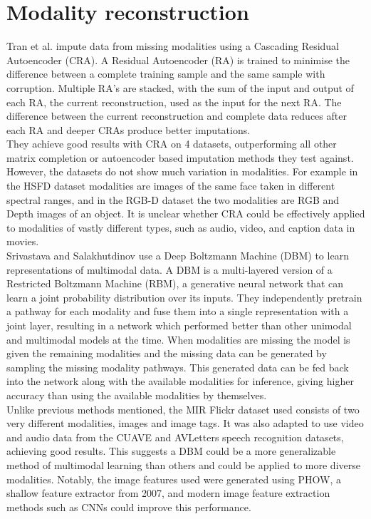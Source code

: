 \section{Modality reconstruction}
Tran et al. \cite{CRA} impute data from missing modalities using a Cascading Residual Autoencoder (CRA). A Residual Autoencoder (RA) is trained to minimise the difference between a complete training sample and the same sample with corruption. Multiple RA’s are stacked, with the sum of the input and output of each RA, the current reconstruction, used as the input for the next RA. The difference between the current reconstruction and complete data reduces after each RA and deeper CRAs produce better imputations.\\

They \cite{CRA} achieve good results with CRA on 4 datasets, outperforming all other matrix completion or autoencoder based imputation methods they test against. However, the datasets do not show much variation in modalities. For example in the HSFD dataset modalities are images of the same face taken in different spectral ranges, and in the RGB-D dataset the two modalities are RGB and Depth images of an object. It is unclear whether CRA could be effectively applied to modalities of vastly different types, such as audio, video, and caption data in movies.\\

Srivastava and Salakhutdinov \cite{DBM} use a Deep Boltzmann Machine (DBM) to learn representations of multimodal data. A DBM is a multi-layered version of a Restricted Boltzmann Machine (RBM), a generative neural network that can learn a joint probability distribution over its inputs. They independently pretrain a pathway for each modality and fuse them into a single representation with a joint layer, resulting in a network which performed better than other unimodal and multimodal models at the time. When modalities are missing the model is given the remaining modalities and the missing data can be generated by sampling the missing modality pathways. This generated data can be fed back into the network along with the available modalities for inference, giving higher accuracy than using the available modalities by themselves.\\

Unlike previous methods mentioned, the MIR Flickr dataset used consists of two very different modalities, images and image tags. It was also adapted to use video and audio data from the CUAVE and AVLetters speech recognition datasets, achieving good results. This suggests a DBM could be a more generalizable method of multimodal learning than others and could be applied to more diverse modalities. Notably, the image features used were generated using PHOW, a shallow feature extractor from 2007, and modern image feature extraction methods such as CNNs could improve this performance.\\

